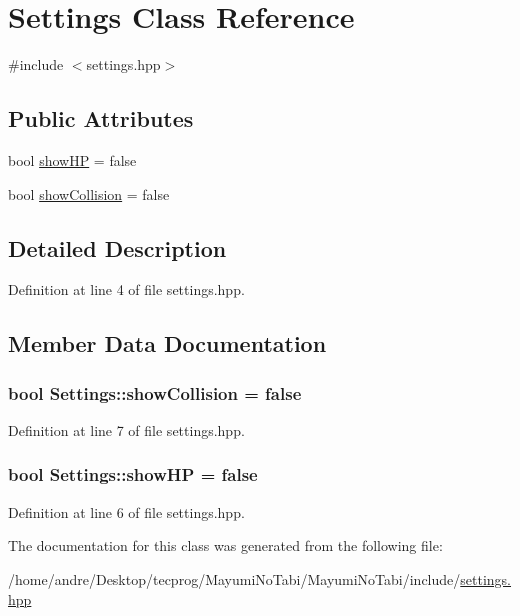 \hypertarget{class_settings}{\section{Settings Class Reference}
\label{class_settings}
}


{\ttfamily \#include $<$settings.\-hpp$>$}

\subsection*{Public Attributes}
\begin{DoxyCompactItemize}
\item 
bool \hyperlink{class_settings_aa0365b37ea244b500083ffcf438fe6a0}{show\-H\-P} = false
\item 
bool \hyperlink{class_settings_a9a20962e1f2da3c227b7e48616e28f48}{show\-Collision} = false
\end{DoxyCompactItemize}


\subsection{Detailed Description}


Definition at line 4 of file settings.\-hpp.



\subsection{Member Data Documentation}
\hypertarget{class_settings_a9a20962e1f2da3c227b7e48616e28f48}{
\subsubsection[{show\-Collision}]{\setlength{\rightskip}{0pt plus 5cm}bool Settings\-::show\-Collision = false}}\label{class_settings_a9a20962e1f2da3c227b7e48616e28f48}


Definition at line 7 of file settings.\-hpp.

\hypertarget{class_settings_aa0365b37ea244b500083ffcf438fe6a0}{
\subsubsection[{show\-H\-P}]{\setlength{\rightskip}{0pt plus 5cm}bool Settings\-::show\-H\-P = false}}\label{class_settings_aa0365b37ea244b500083ffcf438fe6a0}


Definition at line 6 of file settings.\-hpp.



The documentation for this class was generated from the following file\-:\begin{DoxyCompactItemize}
\item 
/home/andre/\-Desktop/tecprog/\-Mayumi\-No\-Tabi/\-Mayumi\-No\-Tabi/include/\hyperlink{settings_8hpp}{settings.\-hpp}\end{DoxyCompactItemize}
